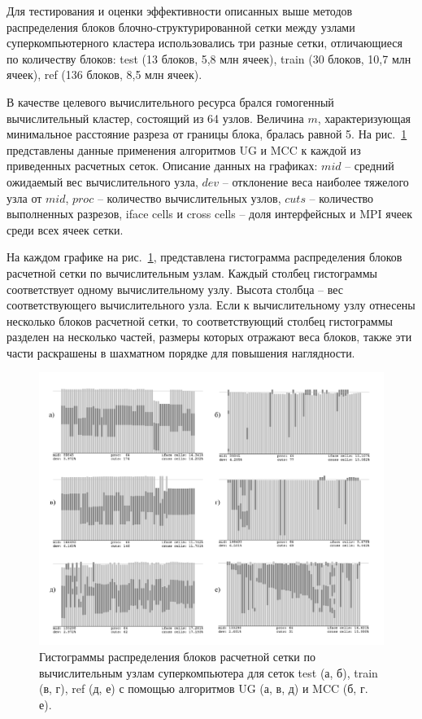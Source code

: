Для тестирования и оценки эффективности описанных выше методов распределения блоков блочно-структурированной сетки между узлами суперкомпьютерного кластера использовались три разные сетки, отличающиеся по количеству блоков: test (13 блоков, 5,8 млн ячеек), train (30 блоков, 10,7 млн ячеек), ref (136 блоков, 8,5 млн ячеек).

В качестве целевого вычислительного ресурса брался гомогенный вычислительный кластер\label{term:cluster_gomo2}, состоящий из 64 узлов.
Величина $m$, характеризующая минимальное расстояние разреза от границы блока, бралась равной 5.
На рис.~\ref{fig:text_2_withcut_2_merged_pic} представлены данные применения алгоритмов UG и MCC к каждой из приведенных расчетных сеток.
Описание данных на графиках: $mid$ -- средний ожидаемый вес вычислительного узла, $dev$ -- отклонение веса наиболее тяжелого узла от $mid$, $proc$ -- количество вычислительных узлов, $cuts$ -- количество выполненных разрезов, iface cells и cross cells -- доля интерфейсных и MPI ячеек среди всех ячеек сетки.

На каждом графике на рис.~\ref{fig:text_2_withcut_2_merged_pic}, представлена гистограмма распределения блоков расчетной сетки по вычислительным узлам.
Каждый столбец гистограммы соответствует одному вычислительному узлу.
Высота столбца -- вес соответствующего вычислительного узла.
Если к вычислительному узлу отнесены несколько блоков расчетной сетки, то соответствующий столбец гистограммы разделен на несколько частей, размеры которых отражают веса блоков, также эти части раскрашены в шахматном порядке для повышения наглядности.

\begin{figure}[ht]
\centering
\includegraphics[width=1.0\textwidth]{./pics/text_2_withcut/2-merged-pic.pdf}
\singlespacing
{}\caption{Гистограммы распределения блоков расчетной сетки по вычислительным узлам суперкомпьютера для сеток test (а, б), train (в, г), ref (д, е) с помощью алгоритмов UG (а, в, д) и MCC (б, г. е).}
\label{fig:text_2_withcut_2_merged_pic}
\end{figure}

